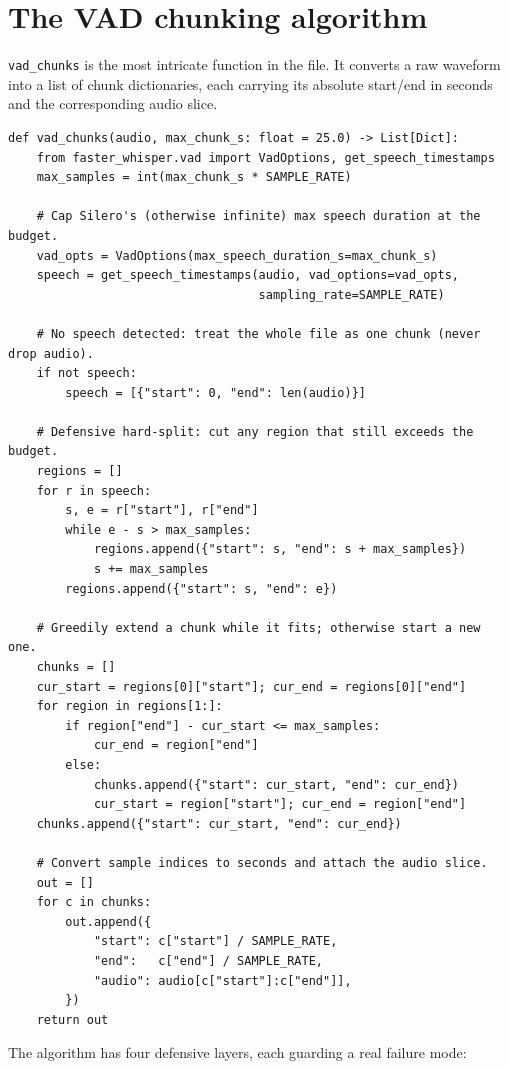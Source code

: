\documentclass[11pt,a4paper]{report}
\newcommand{\code}[1]{\texttt{\small #1}}
\begin{document}
\section{The VAD chunking algorithm}

\code{vad\_chunks} is the most intricate function in the file. It converts a raw
waveform into a list of chunk dictionaries, each carrying its absolute start/end
in seconds and the corresponding audio slice.

\begin{lstlisting}[caption={Silence-aware chunking (abridged).}]
def vad_chunks(audio, max_chunk_s: float = 25.0) -> List[Dict]:
    from faster_whisper.vad import VadOptions, get_speech_timestamps
    max_samples = int(max_chunk_s * SAMPLE_RATE)

    # Cap Silero's (otherwise infinite) max speech duration at the budget.
    vad_opts = VadOptions(max_speech_duration_s=max_chunk_s)
    speech = get_speech_timestamps(audio, vad_options=vad_opts,
                                   sampling_rate=SAMPLE_RATE)

    # No speech detected: treat the whole file as one chunk (never drop audio).
    if not speech:
        speech = [{"start": 0, "end": len(audio)}]

    # Defensive hard-split: cut any region that still exceeds the budget.
    regions = []
    for r in speech:
        s, e = r["start"], r["end"]
        while e - s > max_samples:
            regions.append({"start": s, "end": s + max_samples})
            s += max_samples
        regions.append({"start": s, "end": e})

    # Greedily extend a chunk while it fits; otherwise start a new one.
    chunks = []
    cur_start = regions[0]["start"]; cur_end = regions[0]["end"]
    for region in regions[1:]:
        if region["end"] - cur_start <= max_samples:
            cur_end = region["end"]
        else:
            chunks.append({"start": cur_start, "end": cur_end})
            cur_start = region["start"]; cur_end = region["end"]
    chunks.append({"start": cur_start, "end": cur_end})

    # Convert sample indices to seconds and attach the audio slice.
    out = []
    for c in chunks:
        out.append({
            "start": c["start"] / SAMPLE_RATE,
            "end":   c["end"] / SAMPLE_RATE,
            "audio": audio[c["start"]:c["end"]],
        })
    return out
\end{lstlisting}

The algorithm has four defensive layers, each guarding a real failure mode:
\end{document}
